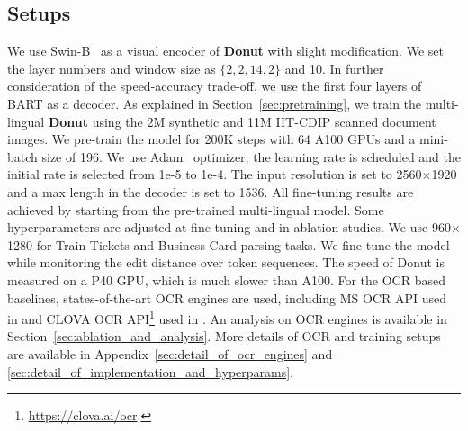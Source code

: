 \documentclass[runningheads]{llncs}
\newcommand\ours{{{\mbox{Donut}}}\xspace}
\newcommand\oursb{{\textbf{\mbox{Donut}}}\xspace}
\begin{document}
\subsection{Setups}
We use Swin-B~\cite{Liu_2021_ICCV} as a visual encoder of \oursb with slight modification.
We set the layer numbers and window size as $\{2, 2, 14, 2\}$ and 10.
In further consideration of the speed-accuracy trade-off, we use the first four layers of BART as a decoder.
As explained in Section~\ref{sec:pretraining}, we train the multi-lingual \oursb using the 2M synthetic and 11M IIT-CDIP scanned document images.
We pre-train the model for 200K steps with 64 A100 GPUs and a mini-batch size of 196.
We use Adam~\cite{Adamoptim} optimizer, the learning rate is scheduled and the initial rate is selected from 1e-5 to 1e-4.
The input resolution is set to 2560$\times$1920 and a max length in the decoder is set to 1536.
All fine-tuning results are achieved by starting from the pre-trained multi-lingual model.
Some hyperparameters are adjusted at fine-tuning and in ablation studies.
We use 960$\times$1280 for Train Tickets and Business Card parsing tasks.
We fine-tune the model while monitoring the edit distance over token sequences.
The speed of \ours is measured on a P40 GPU, which is much slower than A100.
For the OCR based baselines, states-of-the-art OCR engines are used, including MS OCR API used in \cite{xu-etal-2021-layoutlmv2} and CLOVA OCR API\footnote{\url{https://clova.ai/ocr}.} used in \cite{hwang2020spade,hwang2021costeffective}.
An analysis on OCR engines is available in Section~\ref{sec:ablation_and_analysis}.
More details of OCR and training setups are available in Appendix~\ref{sec:detail_of_ocr_engines} and \ref{sec:detail_of_implementation_and_hyperparams}. 
\end{document}

